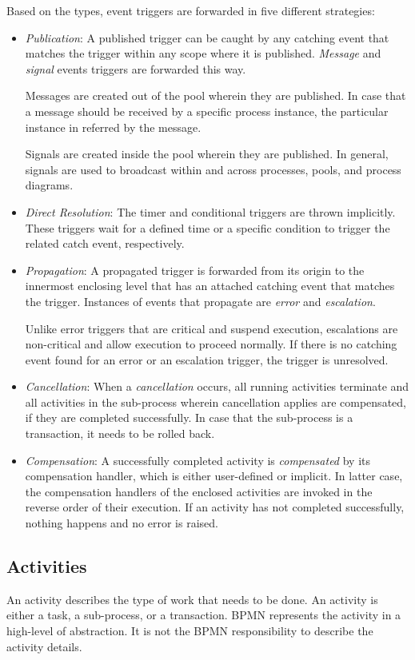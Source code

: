 Based on the types, event triggers are forwarded in five different strategies:
\begin{itemize}
\item \emph{Publication}: A published trigger can be caught by any catching event that matches the trigger within any scope where it is published. \emph{Message} and \emph{signal} events triggers are forwarded this way. 

Messages are created 
out of the pool wherein they are published. In case that a message should be received by a specific process instance, the particular instance in referred by the message.

Signals are created inside the pool wherein they are published. In general, signals are used to broadcast within and across processes, pools, and process diagrams.
\item \emph{Direct Resolution}: The timer and conditional triggers are thrown implicitly.  These triggers wait for a defined time or a specific condition to trigger the related catch event, respectively.

\item \emph{Propagation}: A propagated trigger is forwarded from its origin to the innermost enclosing level that has an attached catching event that matches the trigger. Instances of events that propagate are \emph{error} and \emph{escalation}.

Unlike error triggers that are critical and suspend execution, escalations are non-critical and allow execution to proceed normally. If there is no catching event found for an error or an escalation trigger, the trigger is unresolved.

\item \emph{Cancellation}: When a \emph{cancellation} occurs, all running activities terminate and all activities  in the sub-process wherein cancellation applies are compensated, if they are completed successfully.
In case that the sub-process is a transaction, it needs to be rolled back. 
\item \emph{Compensation}: A successfully completed activity is \emph{compensated} by its compensation handler, which is either user-defined or implicit. In latter case, the compensation handlers of the enclosed activities are invoked in the reverse order of their execution. If an activity has not completed successfully, nothing happens and no error is raised.
\end{itemize}

\subsection{Activities}
An activity describes the type of work that needs to be done. An activity is either a task, a sub-process, or a transaction.
BPMN represents the activity in a high-level of abstraction. It is not the BPMN responsibility to describe the activity details. %

